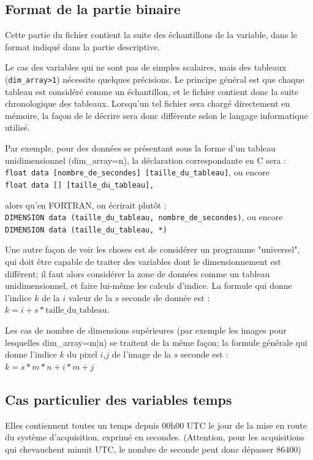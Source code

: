 \subsection{Format de la partie binaire}
Cette partie du fichier contient la suite des
échantillons de la variable, dans le format indiqué dans la
partie descriptive.

    Le cas des variables qui ne sont pas de simples scalaires, mais des
tableaux (\texttt{dim\_array>1}) nécessite quelques précisions.  Le principe
général est que chaque tableau est considéré comme un échantillon, et le fichier
contient donc la suite chronologique des tableaux. Lorsqu'un tel fichier sera
chargé directement en mémoire, la façon de le décrire sera donc différente
selon le langage informatique utilisé.

Par exemple, pour des données se présentant sous la forme d'un tableau 
unidimensionnel (dim\_array=n), la déclaration correspondante en C sera :\\
\texttt{float data [nombre\_de\_secondes] [taille\_du\_tableau]}, ou encore\\
\texttt{float data [] [taille\_du\_tableau],}

alors qu'en FORTRAN, on écrirait plutôt :\\
\texttt{DIMENSION data (taille\_du\_tableau, nombre\_de\_secondes)}, ou encore\\
\texttt{DIMENSION data (taille\_du\_tableau, *)}

Une autre façon de voir les choses est de considérer un programme "universel", qui 
doit être capable de traiter des variables dont le dimensionnement est différent;
il faut alors considérer la zone de données comme un tableau unidimensionnel, 
et faire lui-même les calculs d'indice. La formule qui donne l'indice $k$ de la $i$
valeur de la $s$ seconde de donnée est : $k = i + s*\textrm{taille\_du\_tableau}$.

Les cas de nombre de dimensions supérieures (par exemple les images pour lesquelles
\textsf{dim\_array=m|n}) se traitent de la même façon;
la formule générale qui donne l'indice $k$ du pixel $i$,$j$ de
l'image de la $s$ seconde est :
$ k = s*m*n + i*m + j $

\subsection{Cas particulier des variables temps}

Elles contiennent toutes un temps depuis 00h00 UTC le jour de la mise en route du
système d'acquisition, exprimé 
en secondes. (Attention, pour les acquisitions qui chevauchent minuit
UTC, le nombre de seconde peut donc dépasser 86400)

